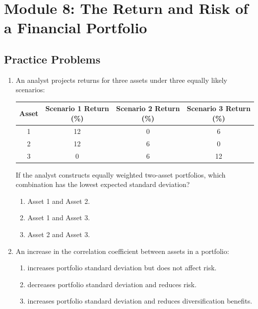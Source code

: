 \newpage

\section{Module 8: The Return and Risk of a Financial Portfolio}
\label{sec:app_Problems_M8}

\subsection{Practice Problems}
\label{subsec:app_Problems_M8}

\begin{enumerate}
	\item An analyst projects returns for three assets under three equally likely scenarios:
	      \begin{center}
	      \begin{tabular}{c  c  c  c}
		      \toprule
		      \textbf{Asset} & \textbf{Scenario 1 Return (\%)} & \textbf{Scenario 2 Return (\%)} & \textbf{Scenario 3 Return (\%)} \\
		      \midrule
		      1 & 12 & 0 & 6 \\
		      2 & 12 & 6 & 0 \\
		      3 & 0 & 6 & 12 \\
		      \bottomrule
	      \end{tabular}
	      \end{center}
	      If the analyst constructs equally weighted two-asset portfolios, which combination has the lowest expected standard deviation?
	      \begin{enumerate}[label=\Alph*.]
		      \item Asset 1 and Asset 2.
		      \item Asset 1 and Asset 3.
		      \item Asset 2 and Asset 3.
	      \end{enumerate}

	\item An increase in the correlation coefficient between assets in a portfolio:
	      \begin{enumerate}[label=\Alph*.]
		      \item increases portfolio standard deviation but does not affect risk.
		      \item decreases portfolio standard deviation and reduces risk.
		      \item increases portfolio standard deviation and reduces diversification benefits.
	      \end{enumerate}


\end{enumerate}
